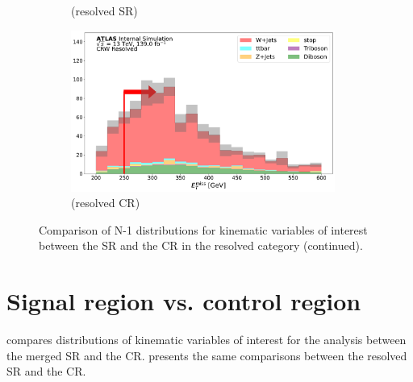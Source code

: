 \begin{figure}[htbp]
\begin{subfigure}{0.45\textwidth}
    \caption{\met (resolved SR)}
     \end{subfigure}
    \begin{subfigure}{0.45\textwidth}
     \includegraphics[width = 0.95\textwidth]{Figures/App_SR_CR_distributions/CRW_Resolved/MetTST_met_N_1.pdf}
     \caption{\met (resolved \wjets CR)}
     \end{subfigure}
     \caption{Comparison of N-1 distributions for kinematic variables of interest between the SR and the \wjets CR in the resolved category (continued).}
  \end{figure}
  
  \captionsetup[figure]{list=yes}


\section{Signal region vs. \ttbar control region}
\label{app:appendix_SR_CR_distributions_ttbar}

\Fig{~\ref{fig:N_1_CRTT_merged}} compares distributions of kinematic variables of interest for the analysis between the merged SR and the \ttbar CR. \Fig{~\ref{fig:N_1_CRTT_resolved}} presents the same comparisons between the resolved SR and the \ttbar CR.

